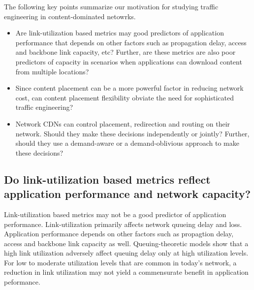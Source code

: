 The following key points summarize our motivation for studying traffic engineering in content-dominated netowrks.
\begin{itemize}
	\item
	Are link-utilization based metrics may good predictors of application performance that depends on other factors such as propagation delay, access and backbone link capacity, etc? Further, are these metrics are also poor predictors of capacity in scenarios when applications can download content from multiple locations?
	\item
	Since content placement can be a more powerful factor in reducing network cost, can content placement flexibility obviate the need for sophisticated traffic engineering?
	\item
	Network CDNs can control placement, redirection and routing on their network. Should they make these decisions independently or jointly? Further, should they use a demand-aware or a demand-oblivious approach to make these decisions?
\end{itemize}


\subsection{Do link-utilization based metrics reflect application performance and network capacity?}


Link-utilization based metrics may not be a good predictor of application performance.
Link-utilization primarily affects network quueing delay and loss. 
Application performance depends on other factors such as propagtion delay, access and backbone link capacity as well.
Queuing-theoretic models show that a high link utilization adversely affect queuing delay only at high utilization levels. For low to moderate utilization levels that are common in today's network, a reduction in link utilization may not yield a commensurate benefit in application peformance. 

